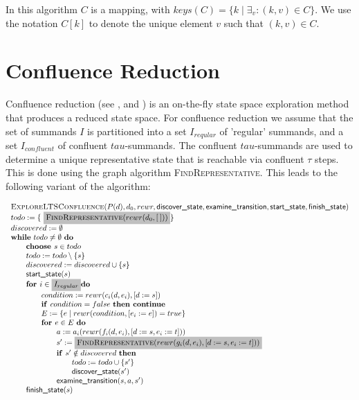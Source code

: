 \documentclass{article}
\newcommand{\emptylist}{\ensuremath{[\:]}}
\newcommand{\Space}{\text{\ }}
\newcommand{\If}{\text{\textbf{if }}}
\newcommand{\Do}{\text{\textbf{do }}}
\newcommand{\Then}{\text{\textbf{then }}}
\newcommand{\For}{\text{\textbf{for }}}
\newcommand{\Continue}{\text{\textbf{continue }}}
\newcommand{\Choose}{\text{\textbf{choose }}}
\begin{document}
In this algorithm $C$ is a mapping, with $keys(C) = \{ k \mid \exists_{v}: (k,v) \in C \}$. We use the notation $C[k]$ to denote the unique element $v$ such that $(k,v) \in C$.

\newpage
\section{Confluence Reduction}

Confluence reduction (see \cite{DBLP:conf/mfcs/GrooteP00}, \cite{Blom01partialt-confluence} and \cite{DBLP:conf/cav/BlomP02}) is an on-the-fly state space exploration method that produces a reduced state space. For confluence reduction we assume that the set of summands $I$ is partitioned into a set $I_{reqular}$ of 'regular' summands, and a set $I_{confluent}$ of confluent $tau$-summands. The confluent $tau$-summands are used to determine a unique representative state that is reachable via confluent $\tau$ steps. This is done using the graph algorithm \textsc{FindRepresentative}. This leads to the following variant of the algorithm:

\[
\begin{tabular}{l}
\textsc{ExploreLTSConfluence}($P(d), d_0, rewr, \textsf{discover\_state}, \textsf{examine\_transition},
\textsf{start\_state}, \textsf{finish\_state})$ \\
$todo := \{\ \colorbox{lightgray}{$\textsc{FindRepresentative}(rewr(d_0, \emptylist))$}\}$ \\
$discovered := \emptyset$ \\
\textbf{while} $todo \neq \emptyset $ \Do \\
\qquad \Choose $s \in todo$ \\
\qquad $todo := todo \setminus \{s\}$ \\
\qquad $discovered := discovered \cup \{s\}$ \\
\qquad $\textsf{start\_state}(s)$ \\
\qquad $\For i \in \colorbox{lightgray}{$I_{regular}$} \Do$ \\
\qquad \qquad $condition := rewr(c_i(d, e_i), [d := s])$ \\
\qquad \qquad $\If condition = false  \Space \Then \Continue$ \\
\qquad \qquad $E := \{ e \mid rewr(condition, [e_i := e]) = true \}$ \\
\qquad \qquad $\For e \in E  \Space \Do$ \\
\qquad \qquad \qquad $a := a_i(rewr(f_i(d,e_i), [d:=s,e_i:=t]))$ \\
\qquad \qquad \qquad $s' := \colorbox{lightgray}{$\textsc{FindRepresentative}(rewr(g_i(d,e_i), [d:=s,e_i:=t]))$}$ \\
\qquad \qquad \qquad $\If s' \notin discovered \Space \Then$ \\
\qquad \qquad \qquad \qquad $todo := todo \cup \{ s' \}$ \\
\qquad \qquad \qquad \qquad $\textsf{discover\_state}(s')$ \\
\qquad \qquad \qquad $\textsf{examine\_transition}(s, a, s')$ \\
\qquad $\textsf{finish\_state}(s)$
\end{tabular}
\]
\end{document}
